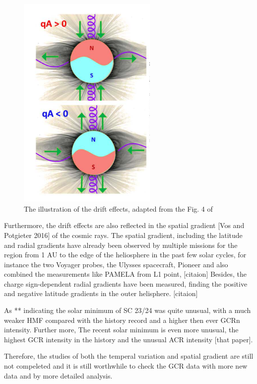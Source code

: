 \begin{figure}
	\centering
	\includegraphics[width = 0.6\textwidth]{images/drift_effect.png}
	\caption{The illustration of the drift effects, adapted from the Fig. 4 of \citep{Rankim 2020?}}
	\label{Fig:drift_effect}	
\end{figure}

Furthermore, the drift effects are also reflected in the spatial gradient [Vos and Potgieter 2016] of the cosmic rays. 
The spatial gradient, including the latitude and radial gradients have already been observed by multiple missions for the region from 1 AU to the edge of the heliosphere in the past few solar cycles, for instance the two Voyager probes, the Ulysses spacecraft, Pioneer and also combined the measurements like PAMELA from L1 point, [citaion]
Besides, the charge sign-dependent radial gradients have been measured, finding the positive and negative latitude gradients in the outer helisphere. [citaion]


As ** indicating the solar minimum of SC 23/24 was quite unusual, with a much weaker \ac{HMF} compared with the history record and a higher then ever GCRn intensity. Further more, The recent solar minimum 
is even more unusual, the highest GCR intensity in the history and the unusual ACR intensity [that paper]. 

Therefore, the studies of both the temperal variation and spatial gradient are still not compeleted and it is still worthwhile to check the GCR data with more new data and by more detailed analysis.
	


